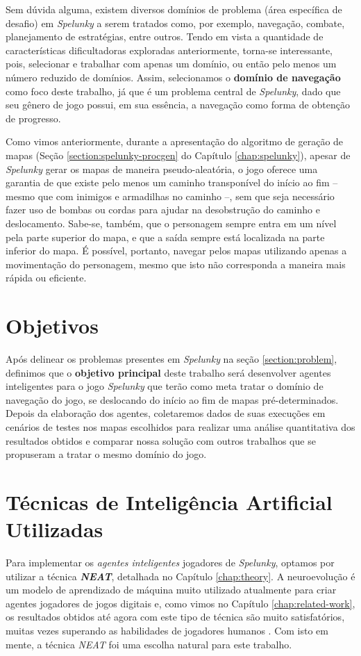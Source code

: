 Sem dúvida alguma, existem diversos domínios de problema (área específica de
desafio) em \textit{Spelunky} a serem tratados como, por exemplo, navegação,
combate, planejamento de estratégias, entre outros. Tendo em vista a quantidade
de características dificultadoras exploradas anteriormente, torna-se
interessante, pois, selecionar e trabalhar com apenas um domínio, ou então pelo
menos um número reduzido de domínios. Assim, selecionamos o \textbf{domínio de
navegação} como foco deste trabalho, já que é um problema central de
\textit{Spelunky}, dado que seu gênero de jogo possui, em sua essência, a
navegação como forma de obtenção de progresso.

Como vimos anteriormente, durante a apresentação do algoritmo de geração de
mapas (Seção \ref{section:spelunky-procgen} do Capítulo \ref{chap:spelunky}),
apesar de \textit{Spelunky} gerar os mapas de maneira pseudo-aleatória, o jogo
oferece uma garantia de que existe pelo menos um caminho transponível do início
ao fim -- mesmo que com inimigos e armadilhas no caminho --, sem que seja
necessário fazer uso de bombas ou cordas para ajudar na desobstrução do caminho
e deslocamento. Sabe-se, também, que o personagem sempre entra em um nível pela
parte superior do mapa, e que a saída sempre está localizada na parte inferior
do mapa. É possível, portanto, navegar pelos mapas utilizando apenas a
movimentação do personagem, mesmo que isto não corresponda a maneira mais rápida
ou eficiente.


\section{\label{section:objectives}Objetivos}
Após delinear os problemas presentes em \textit{Spelunky} na seção
\ref{section:problem}, definimos que o \textbf{objetivo principal} deste
trabalho será desenvolver agentes inteligentes para o jogo \textit{Spelunky} que
terão como meta tratar o domínio de navegação do jogo, se deslocando do início
ao fim de mapas pré-determinados. Depois da elaboração dos agentes, coletaremos
dados de suas execuções em cenários de testes nos mapas escolhidos para realizar
uma análise quantitativa dos resultados obtidos e comparar nossa solução com
outros trabalhos que se propuseram a tratar o mesmo domínio do jogo.


\section{\label{section:techniques}Técnicas de Inteligência Artificial
Utilizadas}
Para implementar os \textit{agentes inteligentes} jogadores de
\textit{Spelunky}, optamos por utilizar a técnica \textbf{\textit{NEAT}},
detalhada no Capítulo \ref{chap:theory}. A neuroevolução é um modelo de
aprendizado de máquina muito utilizado atualmente para criar agentes jogadores
de jogos digitais \cite{DBLP:journals/corr/RisiT14} e, como vimos no Capítulo
\ref{chap:related-work}, os resultados obtidos até agora com este tipo de
técnica são muito satisfatórios, muitas vezes superando as habilidades de
jogadores humanos \cite{NeuroEvolutionAtari}. Com isto em mente, a técnica
\textit{NEAT} foi uma escolha natural para este trabalho.

